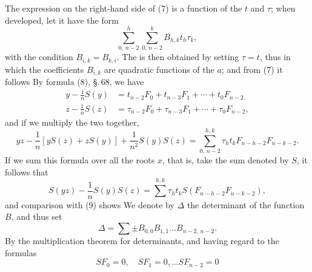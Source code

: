 The expression on the right-hand side of (7) is a 
function of the $t$ and $\tau$; when developed, let it have the form
\[
\sum_{0,\,n-2}^{h} \sum_{0,\,n-2}^{k} B_{h,k} t_h \tau_k,
\]
with the condition $B_{i,k} = B_{k,i}$. The  is then
obtained by setting $\tau = t$, thus
in which the coefficients $B_{i,k}$ are quadratic functions of the $a$;
and from (7) it follows
By formula (8), \S.\,68, we have
\[
\begin{aligned}
y - \frac{1}{n} S(y) &= t_{n-2} F_0 + t_{n-3} F_1 + \cdots + t_0 F_{n-2} \\
z - \frac{1}{n} S(z) &= \tau_{n-2} F_0 + \tau_{n-3} F_1 + \cdots + \tau_0 F_{n-2},
\end{aligned}
\]
and if we multiply the two together,
\[
y z - \frac{1}{n} [y S(z) + z S(y)] + \frac{1}{n^2} S(y) S(z)
= \sum_{0,\,n-2}^{h,k} \tau_h t_k F_{n-h-2} F_{n-k-2}.
\]
If we sum this formula over all the roots $x$, that is, take
the sum denoted by $S$, it follows that
\[
S(y z) - \frac{1}{n} S(y) S(z) = \sum^{h,k} \tau_h t_k S(F_{n-h-2} F_{n-k-2}),
\]
and comparison with (9) shows
We denote by $\varDelta$ the determinant of the function $B$,
and thus set
\[
\varDelta = \sum \pm B_{0,0} B_{1,1} \ldots B_{n-2,\,n-2}.
\]
By the multiplication theorem for determinants, and having
regard to the formulas
\[
S F_0 = 0, \quad S F_1 = 0, \ldots S F_{n-2} = 0
\]
